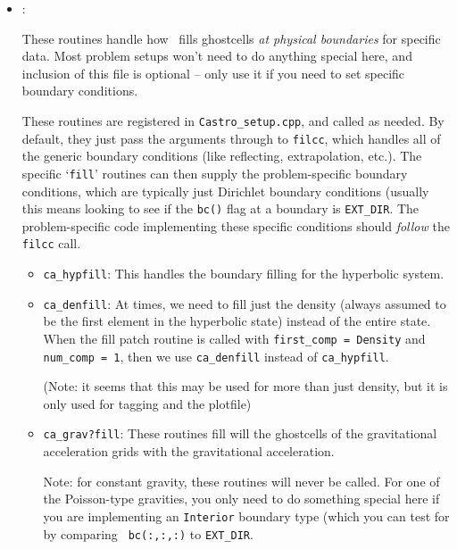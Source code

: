 \begin{itemize}
\begin{itemize}
\begin{itemize}
    \end{itemize}
  \end{itemize}

\item {}:

  These routines handle how \castro\ fills ghostcells {\em
  at physical boundaries} for specific data.  Most problem
  setups won't need to do anything special here, and inclusion
  of this file is optional -- only use it if you need to set
  specific boundary conditions.

  These routines are registered in {\tt Castro\_setup.cpp}, and
  called as needed.  By default, they just
  pass the arguments through to {\tt filcc}, which handles all of
  the generic boundary conditions (like reflecting, extrapolation,
  etc.).  The specific `{\tt fill}' routines can then supply the
  problem-specific boundary conditions, which are typically just
  Dirichlet boundary conditions (usually this means looking to see
  if the {\tt bc()} flag at a boundary is {\tt EXT\_DIR}.  The
  problem-specific code implementing these specific conditions
  should {\em follow} the {\tt filcc} call.

  \begin{itemize}
  \item {\tt ca\_hypfill}:
    This handles the boundary filling for the hyperbolic system.

  \item {\tt ca\_denfill}: At times, we need to fill just the density
    (always assumed to be the first element in the hyperbolic state)
    instead of the entire state.  When the fill patch routine is called
    with {\tt first\_comp = Density} and {\tt num\_comp = 1}, then we
    use {\tt ca\_denfill} instead of {\tt ca\_hypfill}.

    (Note: it seems that this may be used for more than just
    density, but it is only used for tagging and the plotfile)

  \item {\tt ca\_grav?fill}: These routines fill will the ghostcells
    of the gravitational acceleration grids with the gravitational
    acceleration.

    Note: for constant gravity, these routines will never be called.
    For one of the Poisson-type gravities, you only need to do
    something special here if you are implementing an {\tt Interior}
    boundary type (which you can test for by comparing {\tt
    bc(:,:,:)} to {\tt EXT\_DIR}.


\end{itemize}
\end{itemize}
